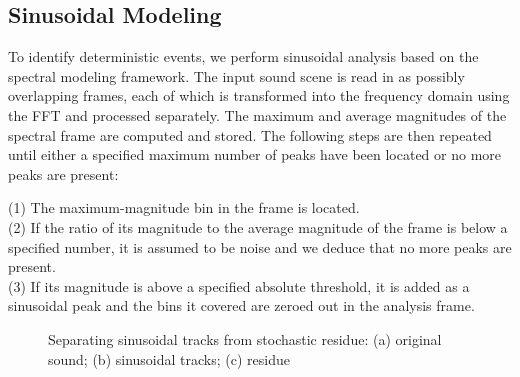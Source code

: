 \documentclass{acmsiggraph}               %
\begin{document}
\subsection{Sinusoidal Modeling}

To identify deterministic events, we perform sinusoidal analysis based on the spectral 
modeling framework. The input sound scene is read in as possibly overlapping 
frames, each of which is transformed into the frequency domain using the 
FFT and processed separately. The maximum and average 
magnitudes of the spectral frame are computed and stored. The following 
steps are then repeated until either a specified maximum number of peaks 
have been located or no more peaks are present:


(1) The maximum-magnitude bin in the frame is located.\\
(2) If the ratio of its magnitude to the average magnitude of the frame is 
below a specified number, it is assumed to be noise and we deduce that no 
more peaks are present.\\
(3) If its magnitude is above a specified absolute threshold, it is added as a 
sinusoidal peak and the bins it covered are zeroed out in the analysis frame.
\begin{figure}[h]
\setlength\textfloatsep{0pt}
\setlength\abovecaptionskip{0pt}
\setlength\belowcaptionskip{0pt}
\centering
\caption{Separating sinusoidal tracks from stochastic residue: (a) original sound; 
(b) sinusoidal tracks; (c) residue}
\label{fig:sines}
\end{figure}
\end{document}
